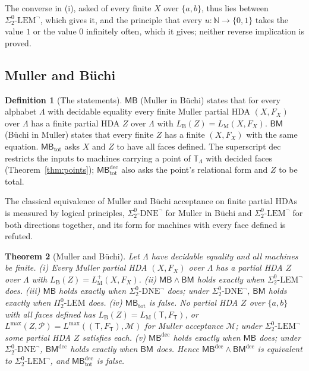 \documentclass{lmcs}
\newtheorem{theorem}{Theorem}[section]
\theoremstyle{definition}
\newtheorem{definition}[theorem]{Definition}
\theoremstyle{remark}
\newcommand{\Nn}{\mathbb{N}}
\newcommand{\Tt}{\mathbb{T}}
\newcommand{\ab}{\{a,b\}}
\newcommand{\prin}[1]{\mathrm{#1}}
\newcommand{\EIO}{\Sigma^0_2\text{-}\prin{LEM}^{\neg}}
\newcommand{\TR}{\Tt_{\Lambda}}
\providecommand{\SDNE}{\Sigma^0_2\text{-}\prin{DNE}^{\neg}}
\providecommand{\PLEM}{\Pi^0_2\text{-}\prin{LEM}}
\providecommand{\LB}[1]{L_{\mathrm{B}}(#1)}
\providecommand{\LM}[1]{L_{\mathrm{M}}(#1)}
\providecommand{\LMp}[1]{L^{+}_{\mathrm{M}}(#1)}
\providecommand{\MinB}{\mathsf{MB}}
\providecommand{\BinM}{\mathsf{BM}}
\providecommand{\MinBt}{\mathsf{MB}_{\mathrm{tot}}}
\providecommand{\MinBd}{\mathsf{MB}^{\mathrm{dec}}}
\providecommand{\BinMd}{\mathsf{BM}^{\mathrm{dec}}}
\providecommand{\MinBtd}{\mathsf{MB}^{\mathrm{dec}}_{\mathrm{tot}}}
\providecommand{\SDNE}{\Sigma^0_2\text{-}\prin{DNE}^{\neg}}
\providecommand{\PLEM}{\Pi^0_2\text{-}\prin{LEM}}
\providecommand{\FT}{F_{\mathsf{T}}}
\providecommand{\Lmax}[1]{L^{\max}(#1)}
\begin{document}
The converse in (i), asked of every finite $X$ over $\ab$, thus lies between $\EIO$, which gives it, and the principle
that every $u\colon\Nn\to\{0,1\}$ takes the value $1$ or the value $0$ infinitely often, which it gives; neither
reverse implication is proved.

\subsection{Muller and B\"uchi}\label{ssec:muller-answer}

\begin{definition}[The statements]\label{def:mb-statements}
$\MinB$ (Muller in B\"uchi) states that for every alphabet $\Lambda$ with decidable equality every finite Muller partial HDA
$(X,F_X)$ over $\Lambda$ has a finite partial HDA $Z$ over $\Lambda$ with $\LB{Z}=\LM{X,F_X}$. $\BinM$ (B\"uchi in Muller) states that
every finite $Z$ has a finite $(X,F_X)$ with the same equation. $\MinBt$ asks $X$ and $Z$ to have all faces
defined. The superscript $\mathrm{dec}$ restricts the inputs to machines carrying a point of $\TR$ with decided
faces (Theorem~\ref{thm:points}); $\MinBtd$ also asks the point's relational form and $Z$ to be total.
\end{definition}

The classical equivalence of Muller and B\"uchi acceptance on finite partial HDAs is measured by logical principles,
$\SDNE$ for Muller in B\"uchi and $\EIO$ for both directions together, and its form for machines with every face
defined is refuted.

\begin{theorem}[Muller and B\"uchi]\label{thm:muller-answer}
Let $\Lambda$ have decidable equality and all machines be finite.
(i)\label{thm:muller-pos} Every Muller partial HDA $(X,F_X)$ over $\Lambda$ has a partial HDA
$Z$ over $\Lambda$ with $\LB{Z}=\LMp{X,F_X}$.
(ii) $\MinB\wedge\BinM$ holds exactly when $\EIO$ does.
(iii)\label{thm:muller-split} $\MinB$ holds exactly when $\SDNE$ does; under $\SDNE$, $\BinM$
holds exactly when $\PLEM$ does.
(iv) $\MinBt$ is false. No partial HDA $Z$ over $\ab$ with all
faces defined has $\LB{Z}=\LM{\mathsf{T},\FT}$, or $\Lmax{Z,\mathcal{P}}=\Lmax{(\mathsf{T},\FT),\mathcal{M}}$ for Muller
acceptance $\mathcal{M}$; under $\EIO$
some partial HDA $Z$ satisfies each.
(v)\label{thm:muller-points} $\MinBd$ holds exactly when $\MinB$ does; under $\SDNE$, $\BinMd$ holds
exactly when $\BinM$ does. Hence $\MinBd\wedge\BinMd$ is equivalent to $\EIO$, and $\MinBtd$ is
false.
\end{theorem}
\end{document}
